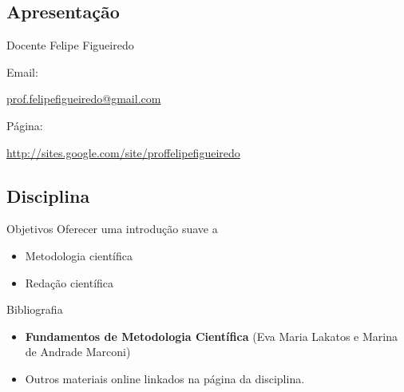 \documentclass{beamer}
\begin{document}
\subsection{Apresentação}

\begin{frame}{Docente}
Felipe Figueiredo

\bigskip

Email:

\href{mailto:prof.felipefigueiredo@gmail.com}{prof.felipefigueiredo@gmail.com}

\bigskip

Página:

\href{http://sites.google.com/site/proffelipefigueiredo}{http://sites.google.com/site/proffelipefigueiredo}

\end{frame}

\subsection{Disciplina}

\begin{frame}{Objetivos}
Oferecer uma introdução suave a
  \begin{itemize}
  \item Metodologia científica
  \item Redação científica
  \end{itemize}
\end{frame}

\begin{frame}{Bibliografia}
  \begin{itemize}
  \item {\bf Fundamentos de Metodologia Científica} (Eva Maria Lakatos
    e Marina de Andrade Marconi)
  \item Outros materiais online linkados na página da disciplina.
  \end{itemize}
\end{frame}
\end{document}
